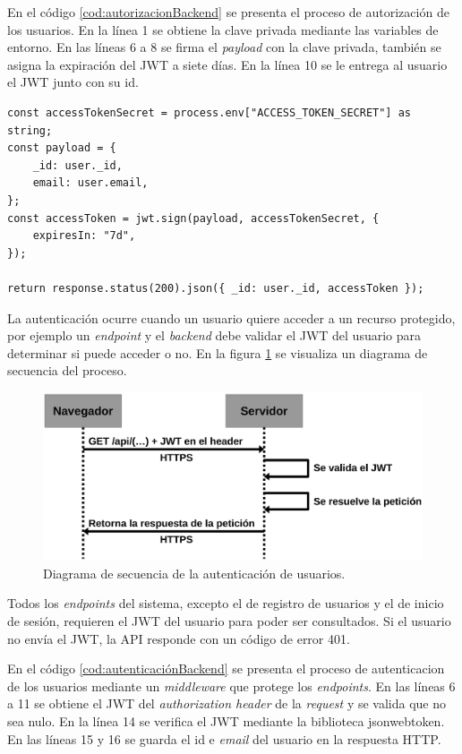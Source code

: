 En el código \ref{cod:autorizacionBackend} se presenta el proceso de autorización de los usuarios. En la línea 1 se obtiene la clave privada mediante las variables de entorno. En las líneas 6 a 8 se firma el \emph{payload} con la clave privada, también se asigna la expiración del JWT a siete días. En la línea 10 se le entrega al usuario el JWT junto con su id.

\begin{lstlisting}[label=cod:autorizacionBackend,caption=Autorización de usuarios.]
const accessTokenSecret = process.env["ACCESS_TOKEN_SECRET"] as string;
const payload = {
    _id: user._id,
    email: user.email,
};
const accessToken = jwt.sign(payload, accessTokenSecret, {
    expiresIn: "7d",
});

return response.status(200).json({ _id: user._id, accessToken });
\end{lstlisting} 

La autenticación ocurre cuando un usuario quiere acceder a un recurso protegido, por ejemplo un \emph{endpoint} y el \emph{backend} debe validar el JWT del usuario para determinar si puede acceder o no. En la figura \ref{fig:diagramaSecuenciaAutenticacionUsuarios} se visualiza un diagrama de secuencia del proceso.

\begin{figure}[H]
	\centering
	\includegraphics[width=.9\textwidth]{./Figures/Diagrama de secuencia autenticacion de usuarios.png}
	\caption{Diagrama de secuencia de la autenticación de usuarios.}
	\label{fig:diagramaSecuenciaAutenticacionUsuarios}
\end{figure}

Todos los \textit{endpoints} del sistema, excepto el de registro de usuarios y el de inicio de sesión, requieren el JWT del usuario para poder ser consultados. Si el usuario no envía el JWT, la API responde con un código de error 401. 

En el código \ref{cod:autenticaciónBackend} se presenta el proceso de autenticacion de los usuarios mediante un \emph{middleware} que protege los \emph{endpoints}. En las líneas 6 a 11 se obtiene el JWT del \textit{authorization header} \citep{WEBSITE:HTTPHEADERAUTHORIZATION} de la \emph{request} y se valida que no sea nulo. En la línea 14 se verifica el JWT mediante la biblioteca jsonwebtoken. En las líneas 15 y 16 se guarda el id e \textit{email} del usuario en la respuesta HTTP.

